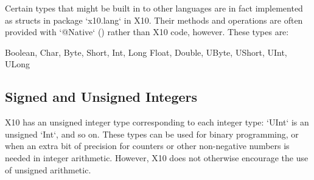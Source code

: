 Certain types that might be built in to other languages are in fact
implemented as structs in package \xcd`x10.lang` in X10. Their methods and
operations are often provided with \xcd`@Native` () rather
than X10 code, however. These types are:
\begin{xten}
Boolean, Char, Byte, Short, Int, Long
Float, Double, UByte, UShort, UInt, ULong
\end{xten}

\subsection{Signed and Unsigned Integers}

X10 has an unsigned integer type corresponding to each integer type:
\xcd`UInt` is an unsigned \xcd`Int`, and so on. These types can be used for
binary programming, or when an extra bit of precision for counters or other
non-negative numbers is needed in integer arithmetic. However, X10 does not
otherwise encourage the use of unsigned arithmetic.




 
  
